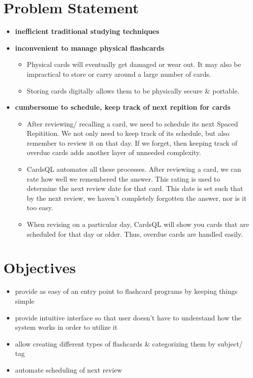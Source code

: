 \documentclass[a4paper]{article}
\begin{document}
\section{Problem Statement}
\label{sec:org46687a0}
\begin{itemize}
\item \textbf{inefficient traditional studying techniques}
\item \textbf{inconvenient to manage physical flashcards}   
\begin{itemize}
\item Physical cards will eventually get damaged or wear out. It may also be impractical to store or carry around a large number of cards.
\item Storing cards digitally allows them to be physically secure \& portable.
\end{itemize}
\item \textbf{cumbersome to schedule, keep track of next repition for cards}   
\begin{itemize}
\item After reviewing/ recalling a card, we need to schedule its next Spaced Repitition. We not only need to keep track of its schedule, but also remember to review it on that day. If we forget, then keeping track of overdue cards adds another layer of unneeded complexity.

\item CardsQL automates all these processes. After reviewing a card, we can rate how well we remembered the answer. This rating is used to determine the next review date for that card. This date is set such that by the next review, we haven't completely forgotten the answer, nor is it too easy.
\item When revising on a particular day, CardsQL will show you cards that are scheduled for that day or older. Thus, overdue cards are handled easily.
\end{itemize}
\end{itemize}

\section{Objectives}
\label{sec:org57a6103}
\begin{itemize}
\item provide as easy of an entry point to flashcard programs by keeping things simple
\item provide intuitive interface so that user doesn't have to understand how the system works in order to utilize it
\item allow creating different types of flashcards \& categorizing them by subject/ tag
\item automate scheduling of next review
\end{itemize}
\end{document}
